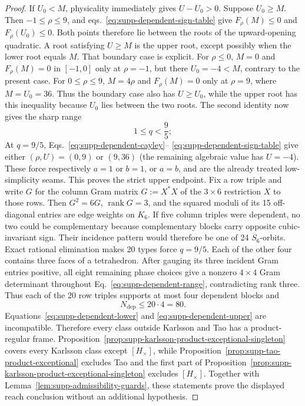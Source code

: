 \begin{proof}
If $U_0<M$, physicality immediately gives $U-U_0>0$. Suppose $U_0\geq M$. Then $-1\leq\rho\leq9$, and eqs.~\eqref{eq:supp-dependent-sign-table} give $F_\rho(M)\leq0$ and $F_\rho(U_0)\leq0$. Both points therefore lie between the roots of the upward-opening quadratic.  A root satisfying $U\geq M$ is the upper root, except possibly when the lower root equals $M$.  That boundary case is explicit.  For $\rho\leq0$, $M=0$ and $F_\rho(M)=0$ in $[-1,0]$ only at $\rho=-1$, but there $U_0=-4<M$, contrary to the present case. For $0\leq\rho\leq9$, $M=4\rho$ and $F_\rho(M)=0$ only at $\rho=9$, where $M=U_0=36$.  Thus the boundary case also has $U\geq U_0$, while the upper root has this inequality because $U_0$ lies between the two roots. The second identity now gives the sharp range
\begin{equation}
1\le q<\frac95;
\label{eq:supp-dependent-range}
\end{equation}
At $q=9/5$, Eqs.~\eqref{eq:supp-dependent-cayley}-- \eqref{eq:supp-dependent-sign-table} give either $(\rho,U)=(0,9)$ or $(9,36)$ (the remaining algebraic value has $U=-4$).  These force respectively $a=1$ or $b=1$, or $a=b$, and are the already treated low-simplicity seams.  This proves the strict upper endpoint. Fix a row triple and write $G$ for the column Gram matrix $G:=X^*X$ of the $3\times6$ restriction $X$ to those rows. Then $G^2=6G$, $\operatorname{rank}G=3$, and the squared moduli of its 15 off-diagonal entries are edge weights on $K_6$. If five column triples were dependent, no two could be complementary because complementary blocks carry opposite cubic-invariant sign. Their incidence pattern would therefore be one of 24 $S_6$-orbits. Exact rational elimination makes 20 types force $q=9/5$.  Each of the other four contains three faces of a tetrahedron. After gauging its three incident Gram entries positive, all eight remaining phase choices give a nonzero $4\times4$ Gram determinant throughout Eq.~\eqref{eq:supp-dependent-range}, contradicting rank three.  Thus each of the 20 row triples supports at most four dependent blocks and
\begin{equation}
N_{\mathrm{dep}}\le20\cdot4=80.
\label{eq:supp-dependent-upper}
\end{equation}
Equations~\eqref{eq:supp-dependent-lower} and \eqref{eq:supp-dependent-upper} are incompatible. Therefore every class outside Karlsson and Tao has a product-regular frame. Proposition~\ref{prop:supp-karlsson-product-exceptional-singleton} covers every Karlsson class except $[H_\times]$, while Proposition~\ref{prop:supp-tao-product-exceptional} excludes Tao and the first part of Proposition~\ref{prop:supp-karlsson-product-exceptional-singleton} excludes $[H_\times]$. {Together with Lemma~\ref{lem:supp-admissibility-guards}, these statements prove the displayed reach conclusion without an additional hypothesis.}
\end{proof}


